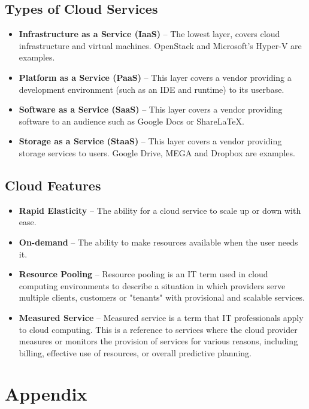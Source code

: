 \documentclass{article}
\begin{document}
\subsection{Types of Cloud Services}

\begin{itemize}
    \item \textbf{Infrastructure as a Service (IaaS)} -- The lowest layer, covers cloud infrastructure and virtual machines. OpenStack and Microsoft's Hyper-V are examples.
    \item \textbf{Platform as a Service (PaaS)} -- This layer covers a vendor providing a development environment (such as an IDE and runtime) to its userbase.
    \item \textbf{Software as a Service (SaaS)} -- This layer covers a vendor providing software to an audience such as Google Docs or ShareLaTeX.
    \item \textbf{Storage as a Service (StaaS)} -- This layer covers a vendor providing storage services to users. Google Drive, MEGA and Dropbox are examples.
\end{itemize}


\subsection{Cloud Features}

\begin{itemize}
    \item \textbf{Rapid Elasticity} -- The ability for a cloud service to scale up or down with ease.
    \item \textbf{On-demand} -- The ability to make resources available when the user needs it.
    \item \textbf{Resource Pooling} -- Resource pooling is an IT term used in cloud computing environments to describe a situation in which providers serve multiple clients, customers or "tenants" with provisional and scalable services. %
    \item \textbf{Measured Service} -- Measured service is a term that IT professionals apply to cloud computing. This is a reference to services where the cloud provider measures or monitors the provision of services for various reasons, including billing, effective use of resources, or overall predictive planning. %

\end{itemize}

\section{Appendix}
\end{document}
